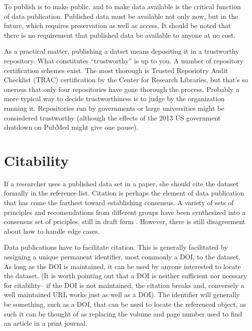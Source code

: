 \documentclass[10pt,a4paper,twocolumn]{article}
\begin{document}
To publish is to make public, and to make data available is the critical function of data publication. 
Published data must be available not only now, but in the future, which requires preservation as well as access. 
It should be noted that there is no requirement that published data be available to anyone at no cost.

As a practical matter, publishing a datset means depositing it in a trustworthy repository. 
What constitutes ``trustworthy'' is up to you. 
A number of repository certification schemes exist. The most thorough is Trusted Reposiotry Audit Checklist (TRAC)\cite{trac_2007} certification by the Center for Research Libraries, but that's so onerous that only four repositories have gone thorough the process. 
Probably a more typical way to decide trustworthiness is to judge by the organization running it. 
Repositories run by governments or large universities might be consisdered trustworthy (although the effects of the 2013 US government shutdown on PubMed might give one pause).


\section*{Citability}\label{citability}

If a researcher uses a published data set in a paper, she should cite the dataset formally in the reference list. 
Citation is perhaps the element of data publication that has come the farthest toward establishing consensus.
A variety of sets of principles and recomendations from different groups have been synthesized into a consensus set of priciples, still in draft form \cite{force11_data_2013}. 
However, there is still disagreement about how to handle edge cases.

Data publications have to facilitate citation. 
This is generally facilitated by assigning a unique permanent identifier, most commonly a DOI, to the dataset. 
As long as the DOI is maintained, it can be used by anyone interested to locate the dataset. 
(It is worth pointing out that a DOI is neither sufficient nor necssary for citability-- if the DOI is not maintained, the citation breaks and, conversely a well maintained URL works just as well as a DOI). 
The identifier will generally be something, such as a DOI, that can be used to locate the referenced object, as such it can be thought of as replacing the volume and page number used to find an article in a print journal.
\end{document}
